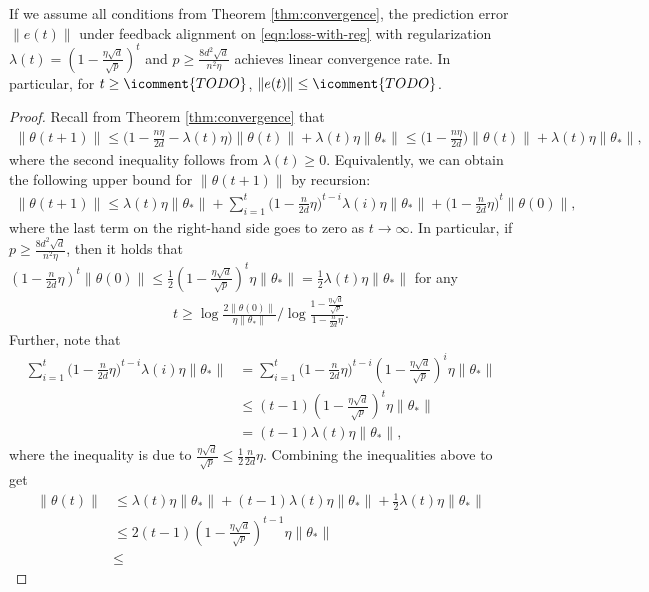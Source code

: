 \begin{corollary}\label{cor:convergence-with-decreasing-reg}
    If we assume all conditions from Theorem \ref{thm:convergence}, the prediction error $\|e(t)\|$ under feedback alignment on \eqref{eqn:loss-with-reg} with regularization $\lambda(t) = \left(1-\frac{\eta\sqrt{d}}{\sqrt{p}}\right)^t$ and $p \geq \frac{8d^2\sqrt{d}}{n^2\eta}$ achieves linear convergence rate. In particular, for $t\geq \icomment{TODO}$, $\|e(t)\| \leq \icomment{TODO}$.
\end{corollary}

\begin{proof}
    Recall from Theorem \ref{thm:convergence} that 
    \begin{align*}
        \|\theta(t+1)\| \leq \Big(1-\frac{n\eta}{2d}- \lambda(t)\eta \Big)\|\theta(t)\| + \lambda(t)\eta\|\theta_\ast\| \leq \Big(1-\frac{n\eta}{2d} \Big)\|\theta(t)\| + \lambda(t)\eta\|\theta_\ast\|,
    \end{align*}
    where the second inequality follows from $\lambda(t)\geq 0$. Equivalently, we can obtain the following upper bound for $\|\theta(t+1)\|$ by recursion:
    \begin{align*}
        \|\theta(t+1)\| \leq \lambda(t)\eta \|\theta_*\| + \sum_{i=1}^t \Big( 1-\frac{n}{2d}\eta \Big)^{t-i} \lambda(i)\eta \|\theta_*\| + \Big( 1-\frac{n}{2d}\eta \Big)^t \|\theta(0)\|,
    \end{align*}
    where the last term on the right-hand side goes to zero as $t\to\infty$. In particular, if $p \geq \frac{8d^2\sqrt{d}}{n^2\eta}$, then it holds that $\left( 1-\frac{n}{2d}\eta \right)^t \|\theta(0)\| \leq \frac{1}{2} \left( 1-\frac{\eta\sqrt{d}}{\sqrt{p}} \right)^t \eta \|\theta_*\| = \frac{1}{2}\lambda(t)\eta \|\theta_*\|$ for any 
    \begin{align*}
        t \geq \log\frac{2\|\theta(0)\|}{\eta\|\theta_*\|} / \log \frac{1-\frac{\eta\sqrt{d}}{\sqrt{p}}}{1 - \frac{n}{2d}\eta}.
    \end{align*}
    Further, note that 
    \begin{align*}
        \sum_{i=1}^t \Big( 1-\frac{n}{2d}\eta \Big)^{t-i} \lambda(i)\eta \|\theta_*\| & = \sum_{i=1}^t \Big( 1-\frac{n}{2d}\eta \Big)^{t-i} \left(1-\frac{\eta\sqrt{d}}{\sqrt{p}}\right)^i \eta \|\theta_*\| \\
        & \leq (t-1) \left(1-\frac{\eta\sqrt{d}}{\sqrt{p}}\right)^t \eta \|\theta_*\| \\
        & = (t-1)\lambda(t)\eta \|\theta_*\|,
    \end{align*}
    where the inequality is due to $\frac{\eta\sqrt{d}}{\sqrt{p}} \leq \frac{1}{2}\frac{n}{2d}\eta$. Combining the inequalities above to get
    \begin{align*}
        \|\theta(t)\| & \leq  \lambda(t)\eta \|\theta_*\| + (t-1)\lambda(t)\eta \|\theta_*\| + \frac{1}{2}\lambda(t)\eta \|\theta_*\| \\
        & \leq 2(t-1) \left(1-\frac{\eta\sqrt{d}}{\sqrt{p}}\right)^{t-1} \eta \|\theta_*\| \\
        & \leq 
    \end{align*}
\end{proof}

